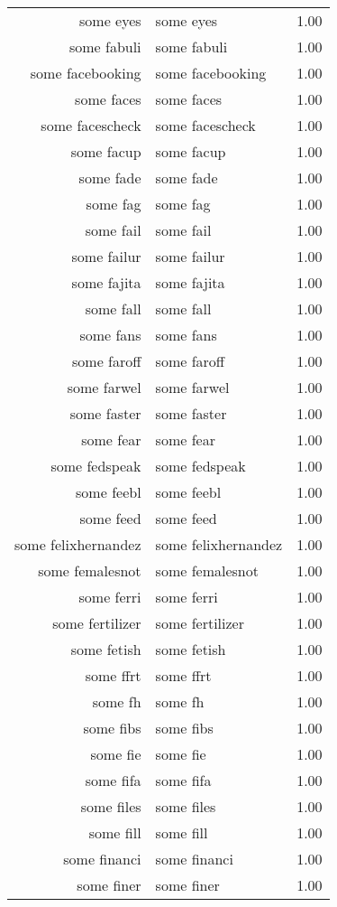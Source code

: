 \begin{table}[ht]
\begin{tabular}{rlr}
  some eyes & some eyes & 1.00 \\ 
  some fabuli & some fabuli & 1.00 \\ 
  some facebooking & some facebooking & 1.00 \\ 
  some faces & some faces & 1.00 \\ 
  some facescheck & some facescheck & 1.00 \\ 
  some facup & some facup & 1.00 \\ 
  some fade & some fade & 1.00 \\ 
  some fag & some fag & 1.00 \\ 
  some fail & some fail & 1.00 \\ 
  some failur & some failur & 1.00 \\ 
  some fajita & some fajita & 1.00 \\ 
  some fall & some fall & 1.00 \\ 
  some fans & some fans & 1.00 \\ 
  some faroff & some faroff & 1.00 \\ 
  some farwel & some farwel & 1.00 \\ 
  some faster & some faster & 1.00 \\ 
  some fear & some fear & 1.00 \\ 
  some fedspeak & some fedspeak & 1.00 \\ 
  some feebl & some feebl & 1.00 \\ 
  some feed & some feed & 1.00 \\ 
  some felixhernandez & some felixhernandez & 1.00 \\ 
  some femalesnot & some femalesnot & 1.00 \\ 
  some ferri & some ferri & 1.00 \\ 
  some fertilizer & some fertilizer & 1.00 \\ 
  some fetish & some fetish & 1.00 \\ 
  some ffrt & some ffrt & 1.00 \\ 
  some fh & some fh & 1.00 \\ 
  some fibs & some fibs & 1.00 \\ 
  some fie & some fie & 1.00 \\ 
  some fifa & some fifa & 1.00 \\ 
  some files & some files & 1.00 \\ 
  some fill & some fill & 1.00 \\ 
  some financi & some financi & 1.00 \\ 
  some finer & some finer & 1.00 \\ 

\end{tabular}
\end{table}
